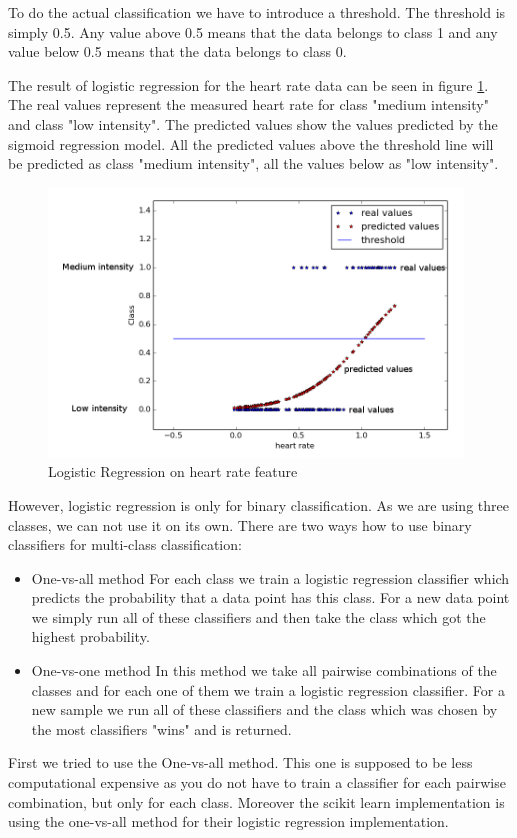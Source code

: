 \documentclass[12pt, a4paper, onecolumn, oneside, parskip=half]{scrartcl}
\begin{document}
To do the actual classification we have to introduce a threshold. The threshold is simply 0.5. Any value above 0.5 means that the data belongs to class 1 and any value below 0.5 means that the data belongs to class 0.

The result of logistic regression for the heart rate data can be seen in figure \ref{logRegFitting}. The real values represent the measured heart rate for class "medium intensity" and class "low intensity". The predicted values show the values predicted by the sigmoid regression model. All the predicted values above the threshold line will be predicted as class "medium intensity", all the values below as "low intensity".

\begin{figure}[ht!]
  \centering
  \includegraphics[width=110mm]{pictures/LogReg_fitting_1.png}
  \caption{Logistic Regression on heart rate feature \label{logRegFitting}}
\end{figure}

However, logistic regression is only for binary classification. As we are using three classes, we can not use it on its own. There are two ways how to use binary classifiers for multi-class classification:
\begin{itemize}
\item One-vs-all method \newline
For each class we train a logistic regression classifier which predicts the probability that a data point has this class. For a new data point we simply run all of these classifiers and then take the class which got the highest probability.
\item One-vs-one method\newline
In this method we take all pairwise combinations of the classes and for each one of them we train a logistic regression classifier. For a new sample we run all of these classifiers and the class  which was chosen by the most classifiers "wins" and is returned.
\end{itemize}
First we tried to use the One-vs-all method. This one is supposed to be less computational expensive as you do not have to train a classifier for each pairwise combination, but only for each class. Moreover the scikit learn implementation is using the one-vs-all method for their logistic regression implementation.
\end{document}
